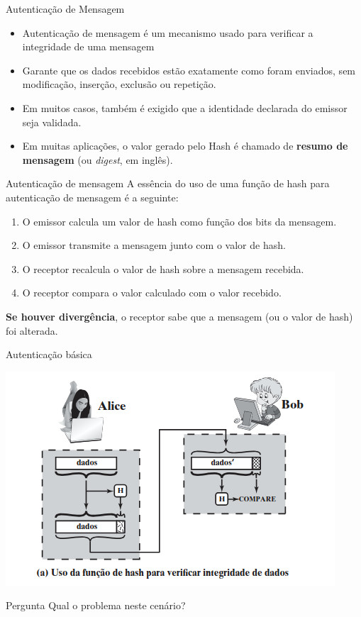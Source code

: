 \begin{frame}{Autenticação de Mensagem}
    \begin{itemize}

        \item Autenticação de mensagem é um mecanismo usado para verificar a integridade de uma mensagem

        \item Garante que os dados recebidos estão exatamente como foram enviados, sem modificação, inserção, exclusão ou repetição.


        \item Em muitos casos, também é exigido que a identidade declarada do emissor seja validada.

        \item Em muitas aplicações, o valor gerado pelo Hash  é chamado de \textbf{resumo de mensagem} (ou \textit{digest}, em inglês).


    \end{itemize}
\end{frame}

\begin{frame}{Autenticação de mensagem}
    A essência do uso de uma função de hash para autenticação de mensagem é a seguinte:

    \begin{enumerate}
        \item O emissor calcula um valor de hash como função dos bits da mensagem.
        \item O emissor transmite a mensagem junto com o valor de hash.
        \item O receptor recalcula o valor de hash sobre a mensagem recebida.
        \item O receptor compara o valor calculado com o valor recebido.
    \end{enumerate}

    \textbf{Se houver divergência}, o receptor sabe que a mensagem (ou o valor de hash) foi alterada.
\end{frame}

\begin{frame}{Autenticação básica}

    \centering
    \includegraphics[width=0.6\linewidth]{Figuras/autenticacao-basica.png}

    \begin{block}{Pergunta}
        Qual o problema neste cenário?
    \end{block}
\end{frame}


